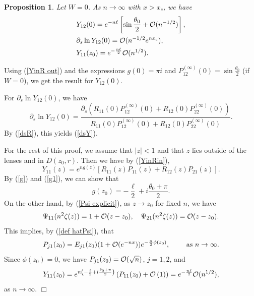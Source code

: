 \documentclass[11pt,fleqn]{article}
\numberwithin{equation}{section}
\def\bigO{{\cal O}}
\newtheorem{proposition}[theorem]{Proposition}
\newenvironment{proof}%
    {\rm \trivlist \item[\hskip \labelsep{\bf Proof. }]}%
    {\hspace*{\fill}$\Box$\endtrivlist}
\begin{document}
\begin{proposition}\label{Y11 and Y12}
Let $W=0$. As $n\to\infty$ with $x>x_c$, we have
\begin{align} \label{Asymptotics_Y12_Y11}
& Y_{12}(0)=  e^{-n\ell}\left[ \sin \frac{\theta_{0}}{2}+\bigO (n^{-1/2} )\right],\\
&\label{dsY} \partial_s \ln Y_{12}(0)= \bigO (n^{-1/2}e^{nx_c} ),\\
&Y_{11}(z_0)=e^{-\frac{n\ell}{2}}\bigO (n^{1/2}).
\end{align}
\end{proposition}
\begin{proof}
Using (\ref{YinR out}) and the expressions $g(0) = \pi i$ and $P_{12}^{(\infty)}(0) = \sin \frac{\theta_{0}}{2}$ (if $W=0$), we get the result for $Y_{12}(0)$.

For $\partial_s \ln Y_{12}(0)$, we have
\begin{equation}
\partial_s \ln Y_{12}(0)=\frac{\partial_s\left(R_{11}(0)P_{12}^{(\infty)}(0)+R_{12}(0)P^{(\infty)}_{22}(0)\right)}{R_{11}(0)P_{12}^{(\infty)}(0)+R_{12}(0)P^{(\infty)}_{22}(0)}.
\end{equation}
By (\ref{dsR}), this yields (\ref{dsY}).


For the rest of this proof, we assume that $|z|<1$ and that $z$ lies outside of the lenses and in $D(z_0,r)$. Then we have by (\ref{YinRin}),
\begin{equation}\label{Y11}
Y_{11}(z) = e^{ng(z)} \left[ R_{11}(z)P_{11}(z) + R_{12}(z)P_{21}(z) \right].
\end{equation}
By (\ref{g}) and (\ref{g1}), we can show that
\begin{equation*}
g(z_{0}) = -\frac{\ell}{2} + i \frac{\theta_{0}+\pi}{2}.
\end{equation*}
On the other hand, by (\ref{Psi explicit}), as $z \to z_{0}$ for fixed $n$, we have
\begin{equation*}
\Psi_{11}(n^{2}\zeta(z)) = 1+ \bigO(z-z_{0}), \quad \Psi_{21}(n^{2}\zeta(z)) = \bigO(z-z_{0}).
\end{equation*}
This implies, by (\ref{def hatPsi}), that
\begin{equation*}
P_{j1}(z_{0}) = E_{j1}(z_{0})(1+\bigO(e^{-nx}))e^{-\frac{n}{2}\phi(z_{0})},\qquad\mbox{ as $n\to\infty$}.
\end{equation*}
Since $\phi(z_{0}) = 0$, we have $P_{j1}(z_{0}) = \bigO(\sqrt{n})$, $j=1,2$, and
\begin{equation*}
Y_{11}(z_{0}) = e^{n \left( -\frac{\ell}{2} +i \frac{\theta_{0}+\pi}{2} \right)}  \left( P_{11}(z_{0}) + \bigO \left( 1 \right) \right)=e^{-\frac{n\ell}{2}}\bigO (n^{1/2}),
\end{equation*}
as $n\to\infty$.
\end{proof}
\end{document}
